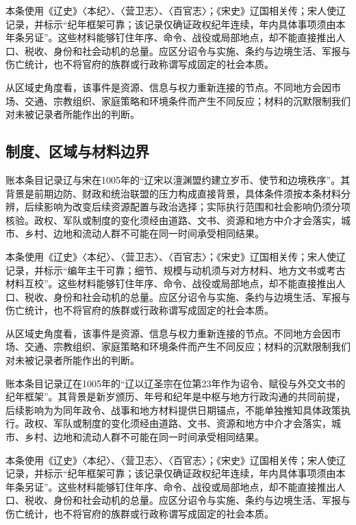 本条使用《辽史》〈本纪〉、〈营卫志〉、〈百官志〉；《宋史》辽国相关传；宋人使辽记录，并标示“纪年框架可靠；该记录仅确证政权纪年连续，年内具体事项须由本年条另证”。这些材料能够钉住年序、命令、战役或局部地点，却不能直接推出人口、税收、身份和社会动机的总量。应区分诏令与实施、条约与边境生活、军报与伤亡统计，也不将官府的族群或行政称谓写成固定的社会本质。

从区域史角度看，该事件是资源、信息与权力重新连接的节点。不同地方会因市场、交通、宗教组织、家庭策略和环境条件而产生不同反应；材料的沉默限制我们对未被记录者所能作出的判断。

\subsection{制度、区域与材料边界}

账本条目记录辽与宋在1005年的“辽宋以澶渊盟约建立岁币、使节和边境秩序”。其背景是前期边防、财政和统治联盟的压力构成直接背景，具体条件须按本条材料分辨，后续影响为改变后续资源配置与政治选择；实际执行范围和社会影响仍须分项核验。政权、军队或制度的变化须经由道路、文书、资源和地方中介才会落实，城市、乡村、边地和流动人群不可能在同一时间承受相同结果。

本条使用《辽史》〈本纪〉、〈营卫志〉、〈百官志〉；《宋史》辽国相关传；宋人使辽记录，并标示“编年主干可靠；细节、规模与动机须与对方材料、地方文书或考古材料互校”。这些材料能够钉住年序、命令、战役或局部地点，却不能直接推出人口、税收、身份和社会动机的总量。应区分诏令与实施、条约与边境生活、军报与伤亡统计，也不将官府的族群或行政称谓写成固定的社会本质。

从区域史角度看，该事件是资源、信息与权力重新连接的节点。不同地方会因市场、交通、宗教组织、家庭策略和环境条件而产生不同反应；材料的沉默限制我们对未被记录者所能作出的判断。

账本条目记录辽在1005年的“辽以辽圣宗在位第23年作为诏令、赋役与外交文书的纪年框架”。其背景是新岁颁历、年号和纪年是中枢与地方行政沟通的共同前提，后续影响为为同年政令、战事和地方材料提供日期锚点，不能单独推知具体政策执行。政权、军队或制度的变化须经由道路、文书、资源和地方中介才会落实，城市、乡村、边地和流动人群不可能在同一时间承受相同结果。

本条使用《辽史》〈本纪〉、〈营卫志〉、〈百官志〉；《宋史》辽国相关传；宋人使辽记录，并标示“纪年框架可靠；该记录仅确证政权纪年连续，年内具体事项须由本年条另证”。这些材料能够钉住年序、命令、战役或局部地点，却不能直接推出人口、税收、身份和社会动机的总量。应区分诏令与实施、条约与边境生活、军报与伤亡统计，也不将官府的族群或行政称谓写成固定的社会本质。

